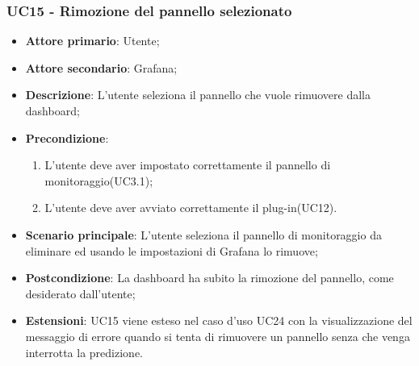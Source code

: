 \subsubsection{UC15 - Rimozione del pannello selezionato}
\label{sssec:uc15}
\begin{itemize}
  \item \textbf{Attore primario}: Utente;
  \item \textbf{Attore secondario}: Grafana;
  \item \textbf{Descrizione}: L'utente seleziona il pannello che vuole rimuovere dalla dashboard;
  \item \textbf{Precondizione}:
  \begin{enumerate}
		\item L'utente deve aver impostato correttamente il pannello di monitoraggio(UC3.1);
		\item L'utente deve aver avviato correttamente il plug-in(UC12).
	\end{enumerate}
  \item \textbf{Scenario principale}: L'utente seleziona il pannello di monitoraggio da eliminare ed usando le impostazioni di Grafana lo rimuove;
  \item \textbf{Postcondizione}: La dashboard ha subito la rimozione del pannello, come desiderato dall'utente;
  \item \textbf{Estensioni}: UC15 viene esteso nel caso d'uso UC24 con la visualizzazione del messaggio di errore quando si tenta di rimuovere un pannello senza che venga interrotta la predizione.
\end{itemize}
